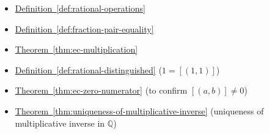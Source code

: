 \begin{dependencies}
\begin{itemize}
  \item \hyperref[def:rational-operations]{Definition~\ref*{def:rational-operations}}
  \item \hyperref[def:fraction-pair-equality]{Definition~\ref*{def:fraction-pair-equality}}
  \item \hyperref[thm:ec-multiplication]{Theorem~\ref*{thm:ec-multiplication}}
  \item \hyperref[def:rational-distinguished]{Definition~\ref*{def:rational-distinguished}}
        \textnormal{($1 = [(1,1)]$)}
  \item \hyperref[thm:ec-zero-numerator]{Theorem~\ref*{thm:ec-zero-numerator}}
        \textnormal{(to confirm $[(a,b)]\neq 0$)}
  \item \hyperref[thm:uniqueness-of-multiplicative-inverse]{Theorem~\ref*{thm:uniqueness-of-multiplicative-inverse}}
        \textnormal{(uniqueness of multiplicative inverse in $\mathbb{Q}$)}
\end{itemize}
\end{dependencies}
